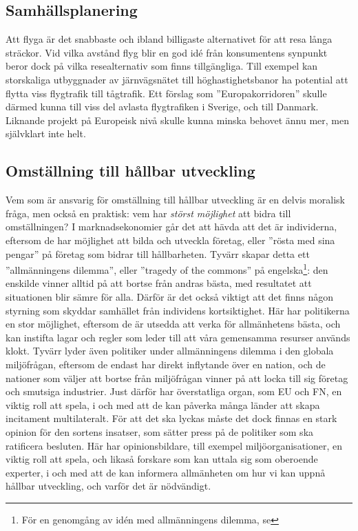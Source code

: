 \documentclass{article}
\begin{document}
\subsection{Samhällsplanering}

Att flyga är det snabbaste och ibland billigaste alternativet för att resa långa sträckor. Vid vilka avstånd flyg blir en god idé från konsumentens synpunkt beror dock på vilka resealternativ som finns tillgängliga. Till exempel kan storskaliga utbyggnader av järnvägsnätet till höghastighetsbanor ha potential att flytta viss flygtrafik till tågtrafik. Ett förslag som ''Europakorridoren''  skulle därmed kunna till viss del avlasta flygtrafiken i Sverige, och till Danmark. Liknande projekt på Europeisk nivå skulle kunna minska behovet ännu mer, men självklart inte helt.

\subsection{Omställning till hållbar utveckling}
Vem som är ansvarig för omställning till hållbar utveckling är en delvis moralisk fråga, men också en praktisk: vem har \emph{störst möjlighet} att bidra till omställningen? I marknadsekonomier går det att hävda att det är individerna, eftersom de har möjlighet att bilda och utveckla företag, eller ''rösta med sina pengar'' på företag som bidrar till hållbarheten. Tyvärr skapar detta ett ''allmänningens dilemma'', eller ''tragedy of the commons'' på engelska\footnote{För en genomgång av idén med allmänningens dilemma, se }: den enskilde vinner alltid på att bortse från andras bästa, med resultatet att situationen blir sämre för alla. Därför är det också viktigt att det finns någon styrning som skyddar samhället från individens kortsiktighet. Här har politikerna en stor möjlighet, eftersom de är utsedda att verka för allmänhetens bästa, och kan instifta lagar och regler som leder till att våra gemensamma resurser används klokt. Tyvärr lyder även politiker under allmänningens dilemma i den globala miljöfrågan, eftersom de endast har direkt inflytande över en nation, och de nationer som väljer att bortse från miljöfrågan vinner på att locka till sig företag och smutsiga industrier. Just därför har överstatliga organ, som EU och FN, en viktig roll att spela, i och med att de kan påverka många länder att skapa incitament multilateralt. För att det ska lyckas måste det dock finnas en stark opinion för den sortens insatser, som sätter press på de politiker som ska ratificera besluten. Här har opinionsbildare, till exempel miljöorganisationer, en viktig roll att spela, och likaså forskare som kan uttala sig som oberoende experter, i och med att de kan informera allmänheten om hur vi kan uppnå hållbar utveckling, och varför det är nödvändigt.
\end{document}
